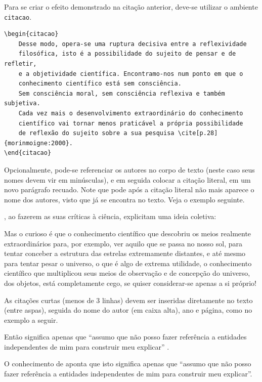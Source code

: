 Para se criar o efeito demonstrado na citação anterior, deve-se utilizar o ambiente \texttt{citacao}.
\begin{verbatim}
\begin{citacao}
    Desse modo, opera-se uma ruptura decisiva entre a reflexividade
    filosófica, isto é a possibilidade do sujeito de pensar e de refletir,
    e a objetividade científica. Encontramo-nos num ponto em que o 
    conhecimento científico está sem consciência.
    Sem consciência moral, sem consciência reflexiva e também subjetiva.
    Cada vez mais o desenvolvimento extraordinário do conhecimento 
    científico vai tornar menos praticável a própria possibilidade 
    de reflexão do sujeito sobre a sua pesquisa \cite[p.28]{morinmoigne:2000}.
\end{citacao}
\end{verbatim}

Opcionalmente, pode-se referenciar os autores no corpo de texto (neste caso seus nomes devem vir em minúsculas), e em seguida colocar a citação literal, em um novo parágrafo recuado.
Note que pode após a citação literal não mais aparece o nome dos autores, visto que já se encontra no texto.
Veja o exemplo seguinte.

\textcite[p.~33]{morinmoigne:2000}, ao fazerem as suas críticas à ciência, explicitam uma ideia coletiva:

\begin{citacao}
Mas o curioso é que o conhecimento científico que descobriu os meios realmente extraordinários para, por exemplo, ver aquilo que se passa no nosso sol, para tentar conceber a estrutura das estrelas extremamente distantes, e até mesmo para tentar pesar o universo, o que é algo de extrema utilidade, o conhecimento científico que multiplicou seus meios de observação e de concepção do universo, dos objetos, está completamente cego, se quiser considerar-se apenas a si próprio!
\end{citacao}

As citações curtas (menos de 3 linhas) devem ser inseridas diretamente no texto (entre aspas), seguida do nome do autor (em caixa alta), ano e página, como no exemplo a seguir.

Então significa apenas que ``assumo que não posso fazer referência a entidades independentes de mim para construir meu explicar'' \cite[p.~35]{maturana:2003}.

O conhecimento de \textcite[p.~35]{maturana:2003} aponta que isto significa apenas que ``assumo que não posso fazer referência a entidades independentes de mim para construir meu explicar''.

